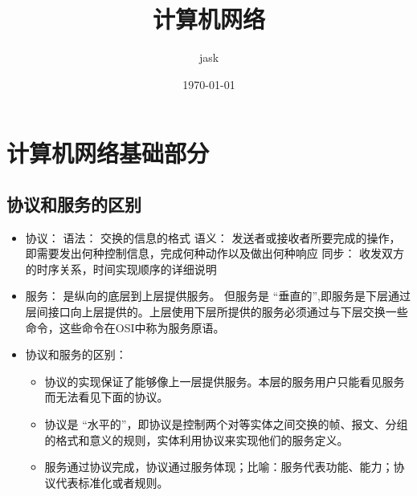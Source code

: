 \documentclass[11pt]{article}
\author{jask}
\date{\today}
\title{计算机网络}
\begin{document}
\maketitle
\section{计算机网络基础部分}
\label{sec:org36c0323}
\subsection{协议和服务的区别}
\label{sec:org503c745}
\begin{itemize}
\item 协议：
语法： 交换的信息的格式
语义： 发送者或接收者所要完成的操作，即需要发出何种控制信息，完成何种动作以及做出何种响应
同步： 收发双方的时序关系，时间实现顺序的详细说明
\item 服务： 是纵向的底层到上层提供服务。
但服务是 “垂直的”,即服务是下层通过层间接口向上层提供的。上层使用下层所提供的服务必须通过与下层交换一些命令，这些命令在OSI中称为服务原语。
\item 协议和服务的区别：
\begin{itemize}
\item 协议的实现保证了能够像上一层提供服务。本层的服务用户只能看见服务而无法看见下面的协议。
\item 协议是 “水平的”，即协议是控制两个对等实体之间交换的帧、报文、分组的格式和意义的规则，实体利用协议来实现他们的服务定义。
\item 服务通过协议完成，协议通过服务体现；比喻：服务代表功能、能力；协议代表标准化或者规则。
\end{itemize}
\end{itemize}
\end{document}
